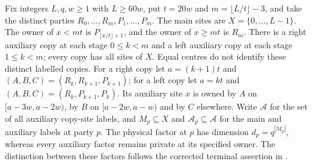 \begin{definition}
    \label{def:chain_terminal_registers}
    \leanok
    Fix integers $L,q,w\ge1$ with $L\ge60w$, put $t=20w$ and
    $m=\lfloor L/t\rfloor-3$, and take the distinct parties
    $R_0,\ldots,R_m,P_1,\ldots,P_m$.
    The main sites are $X=\{0,\ldots,L-1\}$. The owner of $x<mt$ is
    $P_{\lfloor x/t\rfloor+1}$, and the owner of $x\ge mt$ is $R_m$.
    There is a right auxiliary copy at each stage $0\le k<m$ and a left
    auxiliary copy at each stage $1\le k<m$; every copy has all sites of
    $X$. Equal centres do not identify these distinct labelled copies.
    For a right copy let $a=(k+1)t$ and $(A,B,C)=(R_k,R_{k+1},P_{k+1})$;
    for a left copy let $a=kt$ and $(A,B,C)=(R_k,P_{k+1},P_k)$.
    Its auxiliary site $x$ is owned by $A$ on $[a-3w,a-2w)$, by $B$ on
    $[a-2w,a-w)$ and by $C$ elsewhere. Write $\mathcal A$ for the set of
    all auxiliary copy-site labels, and $M_p\subseteq X$ and
    $\mathcal A_p\subseteq\mathcal A$ for the main and auxiliary labels
    at party $p$.
    The physical factor at $p$ has dimension $d_p=q^{|M_p|}$, whereas
    every auxiliary factor remains private at its specified owner.
    The distinction between these factors follows the corrected terminal
    assertion in \cite{gap:tnlean_one_dimensional_band_sweep_corrections}.
\end{definition}

